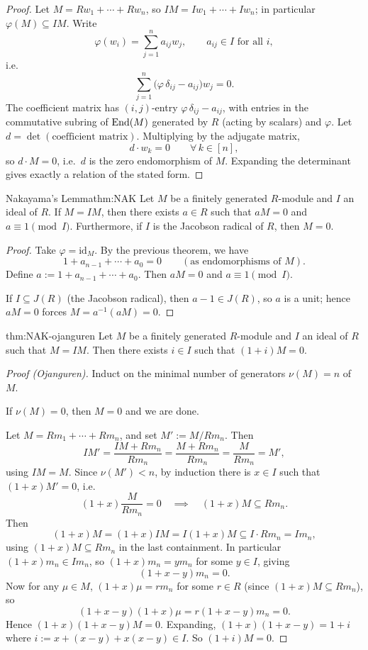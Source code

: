 \begin{proof}
Let $M = Rw_1 + \cdots + Rw_n$, so $IM = Iw_1 + \cdots + Iw_n$; in particular $\varphi(M) \subseteq IM$. Write
\[
\varphi(w_i) = \sum_{j=1}^n a_{ij} w_j, \qquad a_{ij} \in I \text{ for all } i,
\]
i.e.
\[
\sum_{j=1}^n \bigl(\varphi\,\delta_{ij} - a_{ij}\bigr) w_j = 0.
\]
The coefficient matrix has $(i,j)$-entry $\varphi\,\delta_{ij} - a_{ij}$, with entries in the commutative subring of $\operatorname{End}(M)$ generated by $R$ (acting by scalars) and $\varphi$. Let $d = \det(\text{coefficient matrix})$. Multiplying by the adjugate matrix,
\[
d \cdot w_k = 0 \qquad \forall\, k \in [n],
\]
so $d \cdot M = 0$, i.e.\ $d$ is the zero endomorphism of $M$. Expanding the determinant gives exactly a relation of the stated form.
\end{proof}

\begin{theorem}{Nakayama's Lemma}{thm:NAK}
Let $M$ be a finitely generated $R$-module and $I$ an ideal of $R$. If $M = IM$, then there exists $a \in R$ such that $aM = 0$ and $a \equiv 1 \pmod I$. Furthermore, if $I$ is the Jacobson radical of $R$, then $M = 0$.
\end{theorem}

\begin{proof}
Take $\varphi = \mathrm{id}_M$. By the previous theorem, we have
\[
1 + a_{n-1} + \cdots + a_0 = 0 \qquad (\text{as endomorphisms of } M).
\]
Define $a := 1 + a_{n-1} + \cdots + a_0$. Then $aM = 0$ and $a \equiv 1 \pmod I$.

If $I \subseteq J(R)$ (the Jacobson radical), then $a-1 \in J(R)$, so $a$ is a unit; hence $aM=0$ forces $M = a^{-1}(aM) = 0$.
\end{proof}

\begin{theorem}{}{thm:NAK-ojanguren}
Let $M$ be a finitely generated $R$-module and $I$ an ideal of $R$ such that $M = IM$. Then there exists $i \in I$ such that $(1+i)M = 0$.
\end{theorem}

\begin{proof}[Proof (Ojanguren)]
Induct on the minimal number of generators $\nu(M) = n$ of $M$.

If $\nu(M) = 0$, then $M = 0$ and we are done.

Let $M = Rm_1 + \cdots + Rm_n$, and set $M' := M/Rm_n$. Then
\[
IM' = \frac{IM + Rm_n}{Rm_n} = \frac{M + Rm_n}{Rm_n} = \frac{M}{Rm_n} = M',
\]
using $IM=M$. Since $\nu(M') < n$, by induction there is $x \in I$ such that $(1+x)M' = 0$, i.e.
\[
(1+x)\frac{M}{Rm_n} = 0 \quad\implies\quad (1+x)M \subseteq Rm_n.
\]
Then
\[
(1+x)M = (1+x)IM = I(1+x)M \subseteq I \cdot Rm_n = Im_n,
\]
using $(1+x)M \subseteq Rm_n$ in the last containment. In particular $(1+x)m_n \in Im_n$, so $(1+x)m_n = ym_n$ for some $y \in I$, giving
\[
(1+x-y)m_n = 0.
\]
Now for any $\mu \in M$, $(1+x)\mu = rm_n$ for some $r \in R$ (since $(1+x)M \subseteq Rm_n$), so
\[
(1+x-y)(1+x)\mu = r(1+x-y)m_n = 0.
\]
Hence $(1+x)(1+x-y)M = 0$. Expanding, $(1+x)(1+x-y) = 1+i$ where $i := x + (x-y) + x(x-y) \in I$. So $(1+i)M=0$.
\end{proof}

